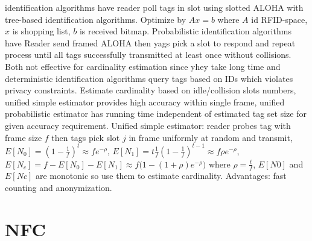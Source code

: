 \documentclass[9pt]{extarticle}
\begin{document}
\begin{multicols}{2}
identification algorithms have reader poll tags in slot using slotted ALOHA with tree-based identification algorithms. Optimize by $Ax=b$ where $A$ id RFID-space, $x$ is shopping list, $b$ is received bitmap. Probabilistic identification algorithms have Reader send framed ALOHA then yags pick a slot to respond and repeat process until all tags successfully transmitted at least once without collisions. Both not effective for cardinality estimation since yhey take long time and deterministic identification algorithms query tags based on IDs which violates privacy constraints. Estimate cardinality based on idle/collision slots numbers, unified simple estimator provides high accuracy within single frame, unified probabilistic estimator has running time independent of estimated tag set size for given accuracy requirement. Unified simple estimator: reader probes tag with frame size $f$ then tags pick slot $j$ in frame uniformly at random and transmit, $E[N_0]=(1-\frac{1}{f})^t\approx{fe^{-\rho}}$, $E[N_1]=t\frac{1}{f}(1-\frac{1}{f})^{t-1}\approx{f\rho{e}^{-\rho}}$, $E[N_c]=f-E[N_0]-E[N_1]\approx{f(1-(1+\rho)e^{-\rho}})$ where $\rho=\frac{t}{f}$, $E[N0]$ and $E[Nc]$ are monotonic so use them to estimate cardinality. Advantages: fast counting and anonymization. 

\section{NFC}


\end{multicols}
\end{document}
